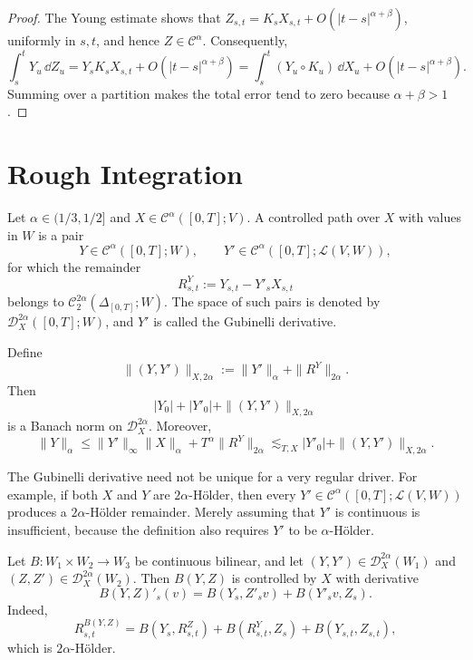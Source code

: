 \begin{proof}
The Young estimate shows that
$Z_{s,t}=K_sX_{s,t}+O(|t-s|^{\alpha+\beta})$, uniformly in $s,t$, and hence
$Z\in\mathcal C^\alpha$.  Consequently,
\[
  \int_s^tY_u\,\dd Z_u
  =Y_sK_sX_{s,t}+O(|t-s|^{\alpha+\beta})
  =\int_s^t(Y_u\circ K_u)\,\dd X_u+O(|t-s|^{\alpha+\beta}).
\]
Summing over a partition makes the total error tend to zero because
$\alpha+\beta>1$.
\end{proof}

\section{Rough Integration}

\begin{de}
Let $\alpha\in(1/3,1/2]$ and
$X\in\mathcal C^\alpha([0,T];V)$.  A controlled path over $X$ with values in
$W$ is a pair
\[
  Y\in\mathcal C^\alpha([0,T];W),\qquad
  Y'\in\mathcal C^\alpha([0,T];\mathcal L(V,W)),
\]
for which the remainder
\[
  R^Y_{s,t}:=Y_{s,t}-Y'_sX_{s,t}
\]
belongs to $\mathcal C_2^{2\alpha}(\Delta_{[0,T]};W)$.  The space of such
pairs is denoted by $\mathscr D_X^{2\alpha}([0,T];W)$, and $Y'$ is called the
Gubinelli derivative.
\end{de}

Define
\[
  \|(Y,Y')\|_{X,2\alpha}
  :=\|Y'\|_\alpha+\|R^Y\|_{2\alpha}.
\]
Then
\[
  |Y_0|+|Y'_0|+\|(Y,Y')\|_{X,2\alpha}
\]
is a Banach norm on $\mathscr D_X^{2\alpha}$.  Moreover,
\[
  \|Y\|_\alpha
  \le \|Y'\|_\infty\|X\|_\alpha+T^\alpha\|R^Y\|_{2\alpha}
  \lesssim_{T,X}|Y'_0|+\|(Y,Y')\|_{X,2\alpha}.
\]

\begin{remark}
The Gubinelli derivative need not be unique for a very regular driver.  For
example, if both $X$ and $Y$ are $2\alpha$-Hölder, then every
$Y'\in\mathcal C^\alpha([0,T];\mathcal L(V,W))$ produces a $2\alpha$-Hölder
remainder.  Merely assuming that $Y'$ is continuous is insufficient, because
the definition also requires $Y'$ to be $\alpha$-Hölder.
\end{remark}

\begin{eg}
Let $B\colon W_1\times W_2\to W_3$ be continuous bilinear, and let
$(Y,Y')\in\mathscr D_X^{2\alpha}(W_1)$ and
$(Z,Z')\in\mathscr D_X^{2\alpha}(W_2)$.  Then $B(Y,Z)$ is controlled by $X$
with derivative
\[
  B(Y,Z)'_s(v)=B(Y_s,Z'_s v)+B(Y'_s v,Z_s).
\]
Indeed,
\[
  R^{B(Y,Z)}_{s,t}
  =B(Y_s,R^Z_{s,t})+B(R^Y_{s,t},Z_s)+B(Y_{s,t},Z_{s,t}),
\]
which is $2\alpha$-Hölder.
\end{eg}

